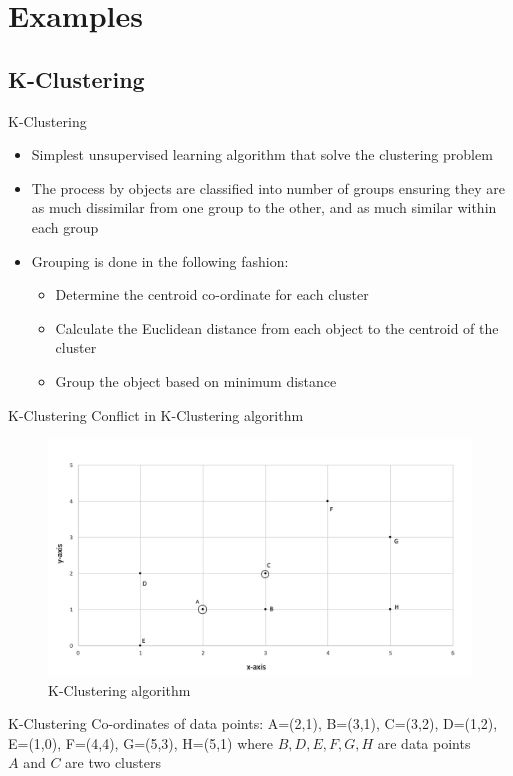 \section{Examples}
\subsection{K-Clustering}
\begin{frame}{K-Clustering}
  \begin{itemize}
    \item Simplest unsupervised learning algorithm that solve the clustering problem
    \item The process by objects are classified into number of groups ensuring they are as much dissimilar from one group to the other, and as much similar within each group
    \item Grouping is done in the following fashion:
          \begin{itemize}
            \item Determine the centroid co-ordinate for each cluster
            \item Calculate the Euclidean distance from each object to the centroid of the cluster
            \item Group the object based on minimum distance
          \end{itemize}
  \end{itemize}
\end{frame}

\begin{frame}{K-Clustering}
	Conflict in K-Clustering algorithm
			\begin{figure}
			\includegraphics[width=0.8\linewidth]{figures/k-cluster.jpg}
			\caption{K-Clustering algorithm}
			\end{figure}
\end{frame}

\begin{frame}{K-Clustering}
  Co-ordinates of data points:
  \newline
  \newline
  A=(2,1), B=(3,1), C=(3,2), D=(1,2),\\
  E=(1,0), F=(4,4), G=(5,3), H=(5,1)
  \newline
  \newline
  where $B, D, E, F, G, H$ are data points\\
  $A$ and $C$ are two clusters\\
\end{frame}

